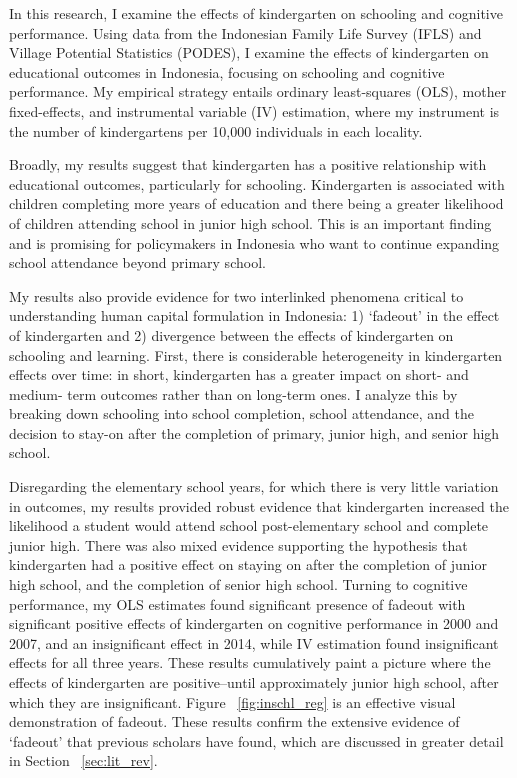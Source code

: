 In this research, I examine the effects of kindergarten on schooling and cognitive performance. Using data from the Indonesian Family Life Survey (IFLS) and Village Potential Statistics (PODES), I examine the effects of kindergarten on educational outcomes in Indonesia, focusing on schooling and cognitive performance. My empirical strategy entails ordinary least-squares (OLS), mother fixed-effects, and instrumental variable (IV) estimation, where my instrument is the number of kindergartens per 10,000 individuals in each locality.

Broadly, my results suggest that kindergarten has a positive relationship with educational outcomes, particularly for schooling. Kindergarten is associated with children completing more years of education and there being a greater likelihood of children attending school in junior high school. This is an important finding and is promising for policymakers in Indonesia who want to continue expanding school attendance beyond primary school.

My results also provide evidence for two interlinked phenomena critical to understanding human capital formulation in Indonesia: 1) `fadeout' in the effect of kindergarten and 2) divergence between the effects of kindergarten on schooling and learning. First, there is considerable heterogeneity in kindergarten effects over time: in short, kindergarten has a greater impact on short- and medium- term outcomes rather than on long-term ones. I analyze this by breaking down schooling into school completion, school attendance, and the decision to stay-on after the completion of primary, junior high, and senior high school. 

Disregarding the elementary school years, for which there is very little variation in outcomes, my results provided robust evidence that kindergarten increased the likelihood a student would attend school post-elementary school and complete junior high. There was also mixed evidence supporting the hypothesis that kindergarten had a positive effect on staying on after the completion of junior high school, and the completion of senior high school. Turning to cognitive performance, my OLS estimates found significant presence of fadeout with significant positive effects of kindergarten on cognitive performance in 2000 and 2007, and an insignificant effect in 2014, while IV estimation found insignificant effects for all three years. These results cumulatively paint a picture where the effects of kindergarten are positive--until approximately junior high school, after which they are insignificant. Figure ~\ref{fig:inschl_reg} is an effective visual demonstration of fadeout. These results confirm the extensive evidence of `fadeout' that previous scholars have found, which are discussed in greater detail in Section ~\ref{sec:lit_rev}. 

